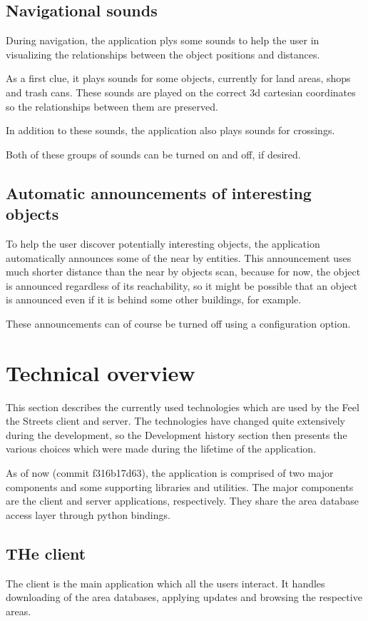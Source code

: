 \documentclass[nolof,digital]{fithesis3}
\begin{document}
\subsection{Navigational sounds}
During navigation, the application plys some sounds to help the user in visualizing the relationships between the object positions and distances.

As a first clue, it plays sounds for some objects, currently for land areas, shops and trash cans. These sounds are played on the correct 3d cartesian coordinates so the relationships between them are preserved.

In addition to these sounds, the application also plays sounds for crossings.

Both of these groups of sounds can be turned on and off, if desired.
\subsection{Automatic announcements of interesting objects}
To help the user discover potentially interesting objects, the application automatically announces some of the near by entities. This announcement uses much shorter distance than the near by objects scan, because for now, the object is announced regardless of its reachability, so it might be possible that an object is announced even if it is behind some other buildings, for example.

These announcements can of course be turned off using a configuration option.
\section{Technical overview}
This section describes the currently used technologies which are used by the Feel the Streets client and server. The technologies have changed quite extensively during the development, so the Development history section then presents the various choices which were made during the lifetime of the application.

As of now (commit f316b17d63), the application is comprised of two major components and some supporting libraries and utilities. The major components are the client and server applications, respectively. They share the area database access layer through python bindings.
\subsection{THe client}
The client is the main application which all the users interact. It handles downloading of the area databases, applying updates and browsing the respective areas.
\end{document}
